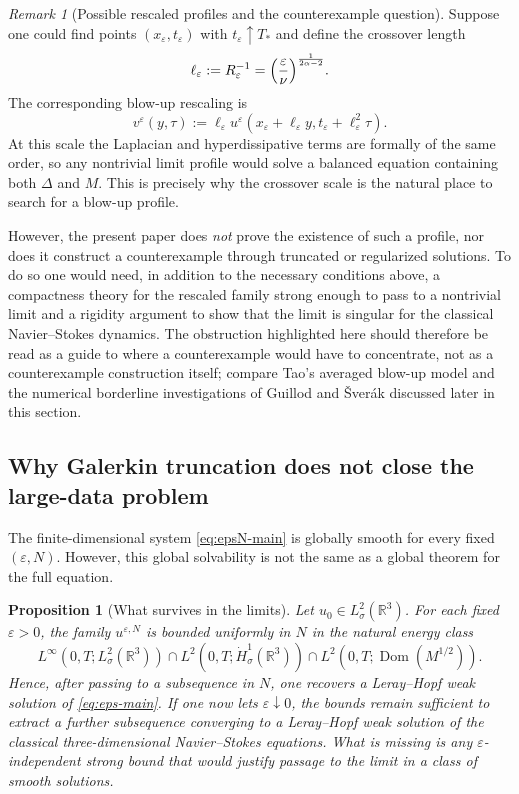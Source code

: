 \documentclass[11pt]{article}
\newtheorem{proposition}[theorem]{Proposition}
\theoremstyle{definition}
\theoremstyle{remark}
\newtheorem{remark}[theorem]{Remark}
\newcommand{\R}{\mathbb{R}}
\newcommand{\Dom}{\operatorname{Dom}}
\begin{document}
\begin{remark}[Possible rescaled profiles and the counterexample question]\label{rem:selfsimilar-open}
Suppose one could find points $(x_\varepsilon,t_\varepsilon)$ with $t_\varepsilon\uparrow T_*$ and define the crossover length
\[
\ell_\varepsilon:=R_\varepsilon^{-1}=\Bigl(\frac{\varepsilon}{\nu}\Bigr)^{\frac{1}{2\alpha-2}}.
\]
The corresponding blow-up rescaling is
\[
v^\varepsilon(y,\tau):=\ell_\varepsilon u^\varepsilon(x_\varepsilon+\ell_\varepsilon y,
 t_\varepsilon+\ell_\varepsilon^2\tau).
\]
At this scale the Laplacian and hyperdissipative terms are formally of the same order, so any nontrivial limit profile would solve a balanced equation containing both $\Delta$ and $M$. This is precisely why the crossover scale is the natural place to search for a blow-up profile.

However, the present paper does \emph{not} prove the existence of such a profile, nor does it construct a counterexample through truncated or regularized solutions. To do so one would need, in addition to the necessary conditions above, a compactness theory for the rescaled family strong enough to pass to a nontrivial limit and a rigidity argument to show that the limit is singular for the classical Navier--Stokes dynamics. The obstruction highlighted here should therefore be read as a guide to where a counterexample would have to concentrate, not as a counterexample construction itself; compare Tao's averaged blow-up model and the numerical borderline investigations of Guillod and \v Sver\'ak discussed later in this section.
\end{remark}

\subsection{Why Galerkin truncation does not close the large-data problem}

The finite-dimensional system \eqref{eq:epsN-main} is globally smooth for every fixed $(\varepsilon,N)$. However, this global solvability is not the same as a global theorem for the full equation.

\begin{proposition}[What survives in the limits]\label{prop:limit-compactness}
Let $u_0\in L^2_\sigma(\R^3)$. For each fixed $\varepsilon>0$, the family $u^{\varepsilon,N}$ is bounded uniformly in $N$ in the natural energy class
\[
L^\infty(0,T;L^2_\sigma(\R^3))\cap L^2(0,T;\dot H^1_\sigma(\R^3))
\cap L^2(0,T;\Dom(M^{1/2})).
\]
Hence, after passing to a subsequence in $N$, one recovers a Leray--Hopf weak solution of \eqref{eq:eps-main}. If one now lets $\varepsilon\downarrow0$, the bounds remain sufficient to extract a further subsequence converging to a Leray--Hopf weak solution of the classical three-dimensional Navier--Stokes equations. What is missing is any $\varepsilon$-independent strong bound that would justify passage to the limit in a class of smooth solutions.
\end{proposition}
\end{document}
